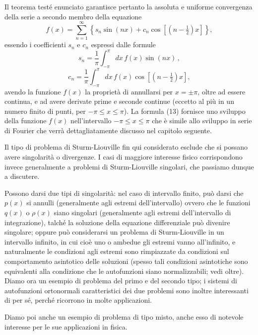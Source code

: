 \documentclass[11pt, a4paper]{book}
\numberwithin{equation}{section}
\begin{document}
Il teorema testé enunciato garantisce pertanto la assoluta e uniforme convergenza della serie a secondo membro della equazione
\begin{equation}
f(x)=\sum_{n=1}^{\infty}\left\{s_n\sin(nx)+c_n\cos\!\left[\left(n-\tfrac{1}{2}\right)x\right]\right\}, \tag{13}
\end{equation}
essendo i coefficienti $s_n$ e $c_n$ espressi dalle formule
\begin{equation}
s_n=\frac{1}{\pi}\int_{-\pi}^{\pi}dx\,f(x)\sin(nx)\,, \tag{14a}
\end{equation}
\begin{equation}
c_n=\frac{1}{\pi}\int_{-\pi}^{\pi}dx\,f(x)\cos\!\left[\left(n-\tfrac{1}{2}\right)x\right], \tag{14b}
\end{equation}
avendo la funzione $f(x)$ la proprietà di annullarsi per $x=\pm\pi$, oltre ad essere continua, e ad avere derivate prime e seconde continue (eccetto al più in un numero finito di punti, per $-\pi\leq x\leq\pi$). La formula (13) fornisce uno sviluppo della funzione $f(x)$ nell'intervallo $-\pi\leq x\leq\pi$ che è simile allo sviluppo in serie di Fourier che verrà dettagliatamente discusso nel capitolo seguente.

Il tipo di problema di Sturm-Liouville fin qui considerato esclude che si possano avere singolarità o divergenze. I casi di maggiore interesse fisico corrispondono invece generalmente a problemi di Sturm-Liouville singolari, che passiamo dunque a discutere.

Possono darsi due tipi di singolarità: nel caso di intervallo finito, può darsi che $p(x)$ si annulli (generalmente agli estremi dell'intervallo) ovvero che le funzioni $q(x)$ o $\rho(x)$ siano singolari (generalmente agli estremi dell'intervallo di integrazione), talché la soluzione della equazione differenziale può divenire singolare; oppure può considerarsi un problema di Sturm-Liouville in un intervallo infinito, in cui cioè uno o ambedue gli estremi vanno all'infinito, e naturalmente le condizioni agli estremi sono rimpiazzate da condizioni sul comportamento asintotico delle soluzioni (spesso tali condizioni asintotiche sono equivalenti alla condizione che le autofunzioni siano normalizzabili; vedi oltre). Diamo ora un esempio di problema del primo e del secondo tipo; i sistemi di autofunzioni ortonormali caratteristici dei due problemi sono inoltre interessanti di per sé, perché ricorrono in molte applicazioni.

Diamo poi anche un esempio di problema di tipo misto, anche esso di notevole interesse per le sue applicazioni in fisica.
\end{document}
